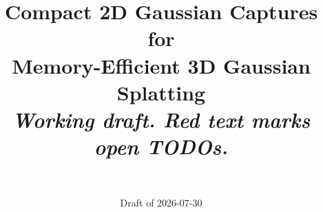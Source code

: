 \documentclass[11pt,a4paper]{article}
\title{%
  Compact 2D Gaussian Captures for\\Memory-Efficient 3D Gaussian Splatting\\[6pt]
  {\normalsize\itshape Working draft. Red text marks open TODOs.}}
\author{%
  \todo{author list}\\
  \todo{affiliations}}
\date{Draft of 2026-07-30}
\begin{document}
\maketitle



\tableofcontents
\bigskip
















\appendix

\end{document}
